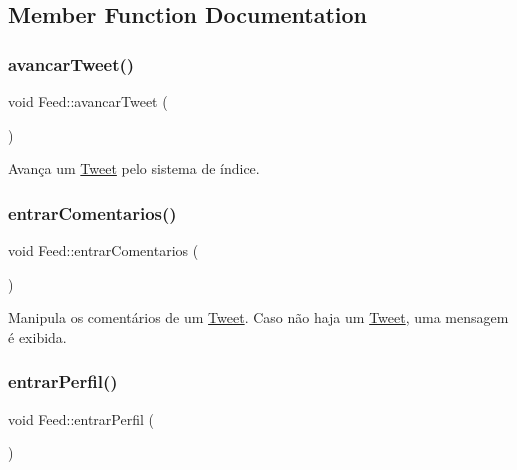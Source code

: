 \subsection{Member Function Documentation}
\mbox{\label{class_feed_ae02e321e3c623da6d4470a9f232c5b5f}} 
\subsubsection{\texorpdfstring{avancar\+Tweet()}{avancarTweet()}}
{\footnotesize\ttfamily void Feed\+::avancar\+Tweet (\begin{DoxyParamCaption}{ }\end{DoxyParamCaption})\hspace{0.3cm}{\ttfamily [private]}}



Avança um \hyperlink{class_tweet}{Tweet} pelo sistema de índice. 

\mbox{\label{class_feed_a22a0e61766790e181a93ad5f79a53e18}} 
\subsubsection{\texorpdfstring{entrar\+Comentarios()}{entrarComentarios()}}
{\footnotesize\ttfamily void Feed\+::entrar\+Comentarios (\begin{DoxyParamCaption}{ }\end{DoxyParamCaption})\hspace{0.3cm}{\ttfamily [private]}}



Manipula os comentários de um \hyperlink{class_tweet}{Tweet}. Caso não haja um \hyperlink{class_tweet}{Tweet}, uma mensagem é exibida. 

\mbox{\label{class_feed_a2f56b3ff3188da4c500f9943c8b8c6da}} 
\subsubsection{\texorpdfstring{entrar\+Perfil()}{entrarPerfil()}}
{\footnotesize\ttfamily void Feed\+::entrar\+Perfil (\begin{DoxyParamCaption}{ }\end{DoxyParamCaption})\hspace{0.3cm}{\ttfamily [private]}}



